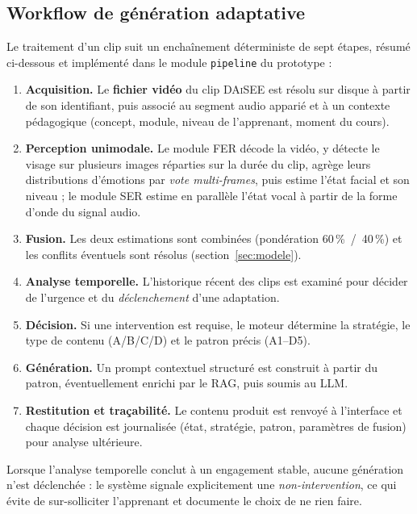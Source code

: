 \subsection{Workflow de génération adaptative}
\label{subsec:workflow}

Le traitement d'un clip suit un enchaînement déterministe de sept étapes, résumé
ci-dessous et implémenté dans le module \texttt{pipeline} du prototype :

\begin{enumerate}[label=\textbf{\arabic*.}]
  \item \textbf{Acquisition.} Le \textbf{fichier vidéo} du clip \textsc{DAiSEE} est
  résolu sur disque à partir de son identifiant, puis associé au segment audio
  apparié et à un contexte pédagogique (concept, module, niveau de l'apprenant,
  moment du cours).
  \item \textbf{Perception unimodale.} Le module FER décode la vidéo, y détecte le
  visage sur plusieurs images réparties sur la durée du clip, agrège leurs
  distributions d'émotions par \emph{vote multi-frames}, puis estime l'état facial
  et son niveau ; le module SER estime en parallèle l'état vocal à partir de la
  forme d'onde du signal audio.
  \item \textbf{Fusion.} Les deux estimations sont combinées (pondération
  60\,\%~/~40\,\%) et les conflits éventuels sont résolus (section~\ref{sec:modele}).
  \item \textbf{Analyse temporelle.} L'historique récent des clips est examiné
  pour décider de l'urgence et du \emph{déclenchement} d'une adaptation.
  \item \textbf{Décision.} Si une intervention est requise, le moteur détermine
  la stratégie, le type de contenu (A/B/C/D) et le patron précis (A1--D5).
  \item \textbf{Génération.} Un prompt contextuel structuré est construit à partir
  du patron, éventuellement enrichi par le RAG, puis soumis au LLM.
  \item \textbf{Restitution et traçabilité.} Le contenu produit est renvoyé à
  l'interface et chaque décision est journalisée (état, stratégie, patron,
  paramètres de fusion) pour analyse ultérieure.
\end{enumerate}

Lorsque l'analyse temporelle conclut à un engagement stable, aucune génération
n'est déclenchée : le système signale explicitement une \emph{non-intervention},
ce qui évite de sur-solliciter l'apprenant et documente le choix de ne rien faire.

